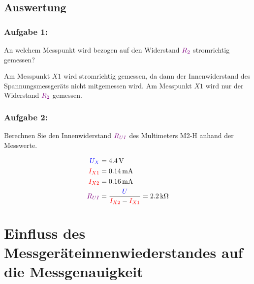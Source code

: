 \documentclass[11pt,a4paper,titlepage]{scrreprt}
\begin{document}
                
            \subsection{Auswertung}
                \subsubsection{Aufgabe 1:}  An welchem Messpunkt wird bezogen auf den Widerstand $\textcolor{violet}{R_2}$ stromrichtig gemessen?
                
                Am Messpunkt $X1$ wird stromrichtig gemessen, da dann der Innenwiderstand des Spannungsmessgeräts nicht mitgemessen wird. Am Messpunkt $X1$ wird nur der Widerstand $\textcolor{violet}{R_2}$ gemessen.
                
                
                \subsubsection{Aufgabe 2:} Berechnen Sie den Innenwiderstand $\textcolor{violet}{R_{UI}}$ des Multimeters M2-H anhand der Messwerte.
                
                \begin{align*}
                \textcolor{blue}{U_X} &= \SI{4,4}{\volt}\\
                \textcolor{red}{I_{X1}} &= \SI{0,14}{\milli\ampere}\\
                \textcolor{red}{I_{X2}} &= \SI{0,16}{\milli\ampere}\\
                \textcolor{violet}{R_{UI}} &= \frac{\textcolor{blue}{U}}{\textcolor{red}{I_{X2}} - \textcolor{red}{I_{X1}}} = \SI{2,2}{\kilo\ohm}
                \end{align*}
        \section{Einfluss des Messgeräteinnenwiederstandes auf die Messgenauigkeit}
\end{document}
